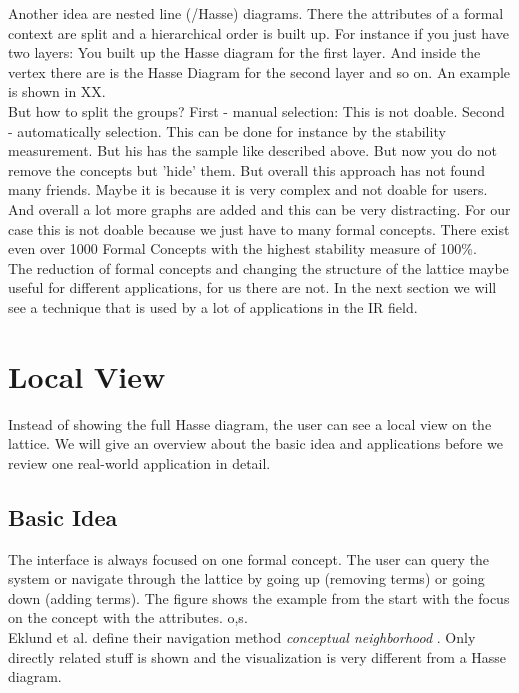 \documentclass[11pt]{report}
\begin{document}
	Another idea are nested line (/Hasse) diagrams. There the attributes of a formal context are split and a hierarchical order is built up. For instance if you just have two layers: You built up the Hasse diagram for the first layer. And inside the vertex there are is the Hasse Diagram for the second layer and so on. An example is shown in XX. \\
	
But how to split the groups? First - manual selection: This is not doable. Second - automatically selection. This can be done for instance by the stability measurement. But his has the sample like described above. But now you do not remove the concepts but 'hide' them. But overall this approach has not found many friends. Maybe it is because it is very complex and not doable for users. And overall a lot more graphs are added and this can be very distracting. For our case this is not doable because we just have to many formal concepts. There exist even over 1000 Formal Concepts with the highest stability measure of 100\%. \\

The reduction of formal concepts and changing the structure of the lattice maybe useful for different applications, for us there are not. In the next section we will see a technique that is used by a lot of applications in the IR field.

\section{Local View}

Instead of showing the full Hasse diagram, the user can see a local view on the lattice. We will give an overview about the basic idea and applications before we review one real-world application in detail. \\

\subsection{Basic Idea}
The interface is always focused on one formal concept. The user can query the system or navigate through the lattice by going up (removing terms) or going down (adding terms). The figure shows the example from the start with the focus on the concept with the attributes. {o,s}. \\ 


Eklund et al. define their navigation method \textit{conceptual neighborhood} \cite{Eklund2009,Eklund2012}. Only directly related stuff is shown and the visualization is very different from a Hasse diagram. \\
\end{document}
